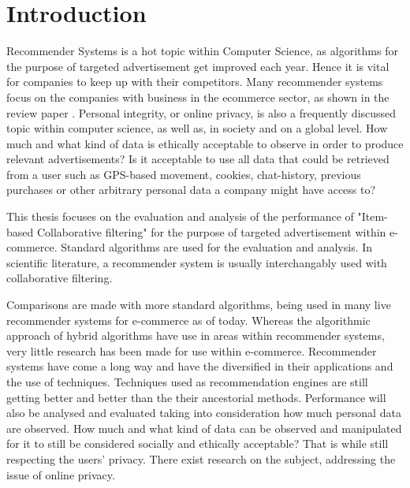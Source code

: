 \chapter{Introduction}
Recommender Systems is a hot topic within Computer Science, as algorithms for the purpose of targeted advertisement get improved each year. Hence it is vital for companies to keep up with their competitors. Many recommender systems focus on the companies with business in the ecommerce sector, as shown in the review paper \cite{Park2012}. Personal integrity, or online privacy, is also a frequently discussed topic within computer science, as well as, in society and on a global level. How much and what kind of data is ethically acceptable to observe in order to produce relevant advertisements? Is it acceptable to use all data that could be retrieved from a user such as GPS-based movement, cookies, chat-history, previous purchases or other arbitrary personal data a company might have access to?

This thesis focuses on the evaluation and analysis of the performance of "Item-based Collaborative filtering" for the purpose of targeted advertisement within e-commerce. Standard algorithms are used for the evaluation and analysis. In scientific literature, a recommender system is usually interchangably used with collaborative filtering.

Comparisons are made with more standard algorithms, being used in many live recommender systems for e-commerce as of today. Whereas the algorithmic approach of hybrid algorithms have use in areas within recommender systems, very little research has been made for use within e-commerce. Recommender systems have come a long way and have the diversified in their applications and the use of techniques. Techniques used as recommendation engines are still getting better and better than the their ancestorial methods. Performance will also be analysed and evaluated taking into consideration how much personal data are observed. How much and what kind of data can be observed and manipulated for it to still be considered socially and ethically acceptable? That is while still respecting the users’ privacy. There exist research‌​ on the subject, addressing the‌​ issue of online‌​ privacy. 

